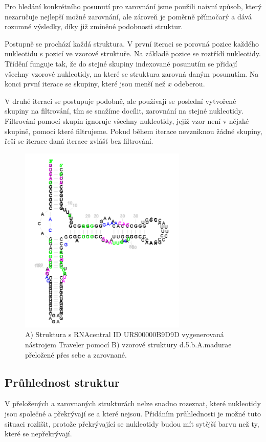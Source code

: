 Pro hledání konkrétního posunutí pro zarovnání jsme použili naivní způsob,
který nezaručuje nejlepší možné zarovnání, ale zároveň je poměrně přímočarý a
dává rozumné výsledky, díky již zmíněné podobnosti struktur.

Postupně se prochází každá struktura. V první iteraci se porovná pozice každého
nukleotidu s pozicí ve vzorové struktuře. Na základě pozice se roztřídí
nukleotidy. Třídění funguje tak, že do stejné skupiny indexované posunutím se
přidají všechny vzorové nukleotidy, na které se struktura zarovná daným posunutím.
Na konci první iterace se skupiny, které jsou menší než $x$ odeberou.

V druhé iteraci se postupuje podobně, ale používají se poslední vytvořené
skupiny na filtrování, tím se snažíme docílit, zarovnání na stejné nukleotidy.
Filtrování pomocí skupin ignoruje všechny nukleotidy, jejiž vzor není v nějaké
skupině, pomocí které filtrujeme. Pokud během iterace nevzniknou žádné skupiny,
řeší se iterace daná iterace zvlášť bez filtrování.

\begin{figure}[H]
  \centering
  \includegraphics[height=90mm]{../img/kap02/align/alignedAlpha1.png}
  \caption{A) Struktura s RNAcentral ID URS00000B9D9D vygenerovaná nástrojem
  Traveler pomocí B) vzorové struktury d.5.b.A.madurae přeložené přes sebe a
  zarovnané.}
\end{figure}

\subsection{Průhlednost struktur}

V přeložených a zarovnaných strukturách nelze snadno rozeznat, které nukleotidy
jsou společné a překrývají se a které nejsou. Přidáním průhlednosti je možné
tuto situaci rozlišit, protože překrývající se nukleotidy budou mít sytější
barvu než ty, které se nepřekrývají.

